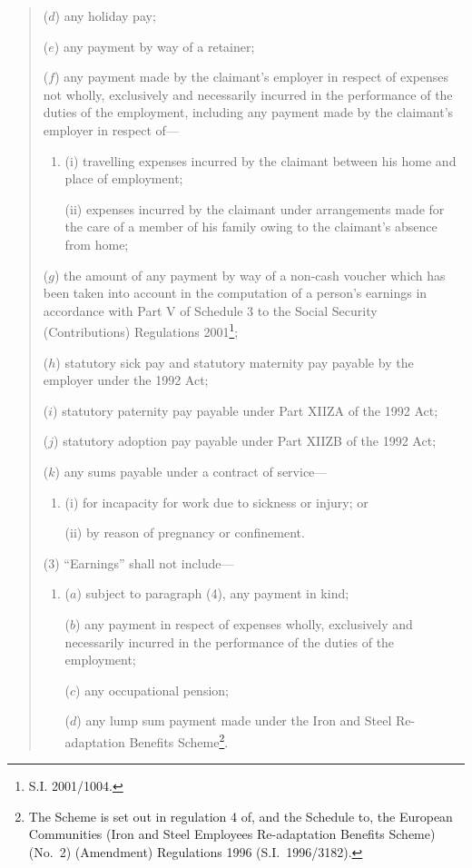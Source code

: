 \documentclass[12pt,a4paper]{article}
\begin{document}
\begin{enumerate}
\begin{quotation}
\begin{enumerate}
($d$) any holiday pay;

($e$) any payment by way of a retainer;

($f$) any payment made by the claimant’s employer in respect of expenses not wholly, exclusively and necessarily incurred in the performance of the duties of the employment, including any payment made by the claimant’s employer in respect of—
\begin{enumerate}\item[]
(i) travelling expenses incurred by the claimant between his home and place of employment;

(ii) expenses incurred by the claimant under arrangements made for the care of a member of his family owing to the claimant’s absence from home;
\end{enumerate}

($g$) the amount of any payment by way of a non-cash voucher which has been taken into account in the computation of a person’s earnings in accordance with Part V of Schedule 3 to the Social Security (Contributions) Regulations 2001\footnote{S.I. 2001/1004.};

($h$) statutory sick pay and statutory maternity pay payable by the employer under the 1992 Act;

($i$) statutory paternity pay payable under Part XIIZA of the 1992 Act;

($j$) statutory adoption pay payable under Part XIIZB of the 1992 Act;

($k$) any sums payable under a contract of service—
\begin{enumerate}\item[]
(i) for incapacity for work due to sickness or injury; or

(ii) by reason of pregnancy or confinement.
\end{enumerate}
\end{enumerate}

(3) “Earnings” shall not include—
\begin{enumerate}\item[]
($a$) subject to paragraph (4), any payment in kind;

($b$) any payment in respect of expenses wholly, exclusively and necessarily incurred in the performance of the duties of the employment;

($c$) any occupational pension;

($d$) any lump sum payment made under the Iron and Steel Re-adaptation Benefits Scheme\footnote{The Scheme is set out in regulation 4 of, and the Schedule to, the European Communities (Iron and Steel Employees Re-adaptation Benefits Scheme) (No.\ 2) (Amendment) Regulations 1996 (S.I.\ 1996/3182).}.
\end{enumerate}


\end{quotation}
\end{enumerate}
\end{document}
